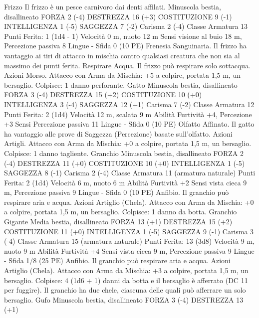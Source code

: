 \begin{multicols}{2}
Frizzo
Il frizzo è un pesce carnivoro dai denti affilati.
Minuscola bestia, disallineato
FORZA 2 (-4)
DESTREZZA 16 (+3)
COSTITUZIONE 9 (-1)
INTELLIGENZA 1 (-5)
SAGGEZZA 7 (-2)
Carisma 2 (-4)
Classe Armatura 13
\hspace*{0pt}\hfill{Punti Ferita}: 1 (1d4 - 1)
Velocità 0 m, nuoto 12 m
Sensi visione al buio 18 m, Percezione passiva 8
Lingue -
Sfida 0 (10 PE)
Frenesia Sanguinaria. Il frizzo ha vantaggio ai tiri di attacco in
mischia contro qualsiasi creatura che non sia al massimo dei
punti ferita.
Respirare Acqua. Il frizzo può respirare solo sottacqua.
Azioni
Morso. Attacco con Arma da Mischia: +5 a colpire, portata 1,5
m, un bersaglio.
Colpisce: 1 danno perforante.
Gatto
Minuscola bestia, disallineato
FORZA 3 (-4)
DESTREZZA 15 (+2)
COSTITUZIONE 10 (+0)
INTELLIGENZA 3 (-4)
SAGGEZZA 12 (+1)
Carisma 7 (-2)
Classe Armatura 12
\hspace*{0pt}\hfill{Punti Ferita}: 2 (1d4)
Velocità 12 m, scalata 9 m
Abilità Furtività +4, Percezione +3
Sensi Percezione passiva 11
Lingue -
Sfida 0 (10 PE)
Olfatto Affinato. Il gatto ha vantaggio alle prove di Saggezza
(Percezione) basate sull’olfatto.
Azioni
Artigli. Attacco con Arma da Mischia: +0 a colpire, portata 1,5
m, un bersaglio.
Colpisce: 1 danno tagliente.
Granchio
Minuscola bestia, disallineato
FORZA 2 (-4)
DESTREZZA 11 (+0)
COSTITUZIONE 10 (+0)
INTELLIGENZA 1 (-5)
SAGGEZZA 8 (-1)
Carisma 2 (-4)
Classe Armatura 11 (armatura naturale)
\hspace*{0pt}\hfill{Punti Ferita}: 2 (1d4)
Velocità 6 m, nuoto 6 m
Abilità Furtività +2
Sensi vista cieca 9 m, Percezione passiva 9
Lingue -
Sfida 0 (10 PE)
Anfibio. Il granchio può respirare aria e acqua.
Azioni
Artiglio (Chela). Attacco con Arma da Mischia: +0 a colpire,
portata 1,5 m, un bersaglio.
Colpisce: 1 danno da botta.
Granchio Gigante
Media bestia, disallineato
FORZA 13 (+1)
DESTREZZA 15 (+2)
COSTITUZIONE 11 (+0)
INTELLIGENZA 1 (-5)
SAGGEZZA 9 (-1)
Carisma 3 (-4)
Classe Armatura 15 (armatura naturale)
\hspace*{0pt}\hfill{Punti Ferita}: 13 (3d8)
Velocità 9 m, nuoto 9 m
Abilità Furtività +4
Sensi vista cieca 9 m, Percezione passiva 9
Lingue -
Sfida 1/8 (25 PE)
Anfibio. Il granchio può respirare aria e acqua.
Azioni
Artiglio (Chela). Attacco con Arma da Mischia: +3 a colpire,
portata 1,5 m, un bersaglio.
Colpisce: 4 (1d6 + 1) danni da botta e il bersaglio è afferrato
(DC 11 per fuggire). Il granchio ha due chele, ciascuna delle
quali può afferrare un solo bersaglio.
Gufo
Minuscola bestia, disallineato
FORZA 3 (-4)
DESTREZZA 13 (+1)

\end{multicols}
